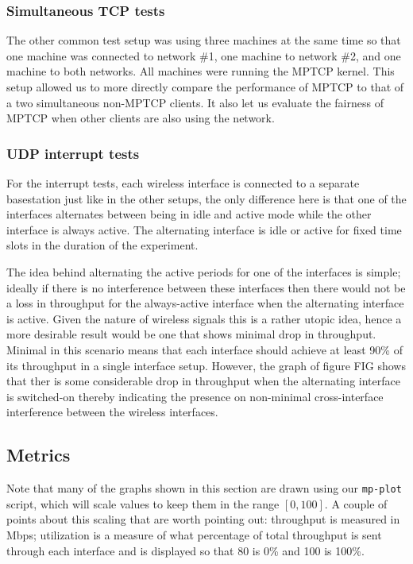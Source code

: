 \subsubsection{Simultaneous TCP tests}
The other common test setup was using three machines at the same time so that
one machine was connected to network \#1, one machine to network \#2, and one
machine to both networks. All machines were running the MPTCP kernel. This setup
allowed us to more directly compare the performance of MPTCP to that of a two
simultaneous non-MPTCP clients. It also let us evaluate the fairness of MPTCP
when other clients are also using the network.

\subsubsection{UDP interrupt tests}
For the interrupt tests, each wireless interface is connected to a separate
basestation just like in the other setups, the only difference here is that one
of the interfaces alternates between being in idle and active mode while the
other interface is always active. The alternating interface is idle or active
for fixed time slots in the duration of the experiment.

The idea behind alternating the active periods for one of the interfaces is
simple; ideally if there is no interference between these interfaces then there
would not be a loss in throughput for the always-active interface when the
alternating interface is active. Given the nature of wireless signals this is a
rather utopic idea, hence a more desirable result would be one that shows
minimal drop in throughput. Minimal in this scenario means that each interface
should achieve at least 90\% of its throughput in a single interface setup.
However, the graph of figure FIG shows that ther is some considerable drop in  %
throughput when the alternating interface is switched-on thereby indicating the
presence on non-minimal cross-interface interference between the wireless
interfaces.

\subsection{Metrics}
Note that many of the graphs shown in this section are drawn using our
\texttt{mp-plot} script, which will scale values to keep them in the range
$[0,100]$. A couple of points about this scaling that are worth pointing out:
throughput is measured in Mbps; utilization is a measure of what percentage of
total throughput is sent through each interface and is displayed so that 80 is
0\% and 100 is 100\%.


